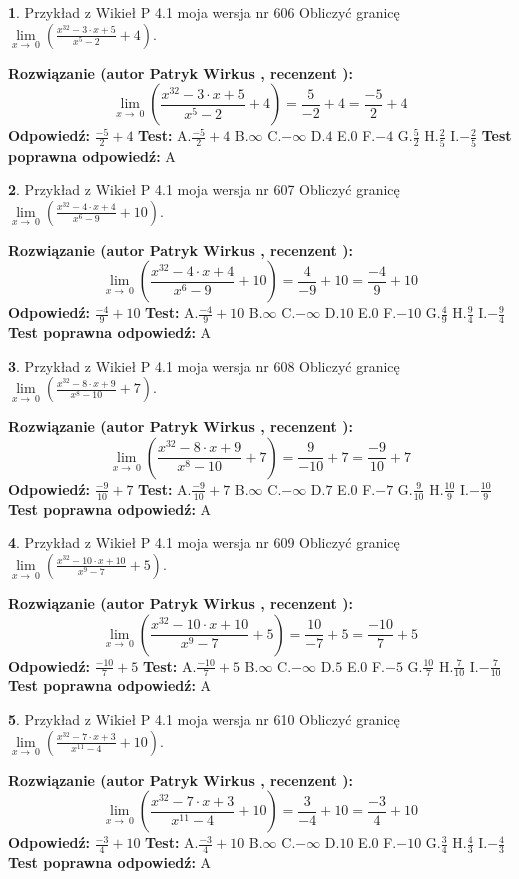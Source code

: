 \documentclass[12pt, a4paper]{article}
\theoremstyle{definition} %
\newtheorem{zad}{}
\newcommand{\zadStart}[1]{\begin{zad}#1\newline}
\newcommand{\zadStop}{\end{zad}}
\newcommand{\rozwStart}[2]{\noindent \textbf{Rozwiązanie (autor #1 , recenzent #2): }\newline}
\newcommand{\rozwStop}{\newline}
\newcommand{\odpStart}{\noindent \textbf{Odpowiedź:}\newline}
\newcommand{\odpStop}{\newline}
\newcommand{\testStart}{\noindent \textbf{Test:}\newline}
\newcommand{\testStop}{\newline}
\newcommand{\kluczStart}{\noindent \textbf{Test poprawna odpowiedź:}\newline}
\newcommand{\kluczStop}{\newline}
\begin{document}
\zadStart{Przykład z Wikieł P 4.1 moja wersja nr 606}
Obliczyć granicę $\lim\limits_{x\to\ 0}(\frac{x^{32}-3 \cdot x +5}{x^{5}-2}+4)$.
\zadStop
\rozwStart{Patryk Wirkus}{}
$$\lim\limits_{x\to\ 0}(\frac{x^{32}-3 \cdot x +5}{x^{5}-2}+4)=\frac{5}{-2}+4=\frac{-5}{2}+4$$
\rozwStop
\odpStart
$\frac{-5}{2}+4$
\odpStop
\testStart
A.$\frac{-5}{2}+4$
B.$\infty$
C.$-\infty$
D.$4$
E.$0$
F.$-4$
G.$\frac{5}{2}$
H.$\frac{2}{5}$
I.$-\frac{2}{5}$
\testStop
\kluczStart
A
\kluczStop



\zadStart{Przykład z Wikieł P 4.1 moja wersja nr 607}
Obliczyć granicę $\lim\limits_{x\to\ 0}(\frac{x^{32}-4 \cdot x +4}{x^{6}-9}+10)$.
\zadStop
\rozwStart{Patryk Wirkus}{}
$$\lim\limits_{x\to\ 0}(\frac{x^{32}-4 \cdot x +4}{x^{6}-9}+10)=\frac{4}{-9}+10=\frac{-4}{9}+10$$
\rozwStop
\odpStart
$\frac{-4}{9}+10$
\odpStop
\testStart
A.$\frac{-4}{9}+10$
B.$\infty$
C.$-\infty$
D.$10$
E.$0$
F.$-10$
G.$\frac{4}{9}$
H.$\frac{9}{4}$
I.$-\frac{9}{4}$
\testStop
\kluczStart
A
\kluczStop



\zadStart{Przykład z Wikieł P 4.1 moja wersja nr 608}
Obliczyć granicę $\lim\limits_{x\to\ 0}(\frac{x^{32}-8 \cdot x +9}{x^{8}-10}+7)$.
\zadStop
\rozwStart{Patryk Wirkus}{}
$$\lim\limits_{x\to\ 0}(\frac{x^{32}-8 \cdot x +9}{x^{8}-10}+7)=\frac{9}{-10}+7=\frac{-9}{10}+7$$
\rozwStop
\odpStart
$\frac{-9}{10}+7$
\odpStop
\testStart
A.$\frac{-9}{10}+7$
B.$\infty$
C.$-\infty$
D.$7$
E.$0$
F.$-7$
G.$\frac{9}{10}$
H.$\frac{10}{9}$
I.$-\frac{10}{9}$
\testStop
\kluczStart
A
\kluczStop



\zadStart{Przykład z Wikieł P 4.1 moja wersja nr 609}
Obliczyć granicę $\lim\limits_{x\to\ 0}(\frac{x^{32}-10 \cdot x +10}{x^{9}-7}+5)$.
\zadStop
\rozwStart{Patryk Wirkus}{}
$$\lim\limits_{x\to\ 0}(\frac{x^{32}-10 \cdot x +10}{x^{9}-7}+5)=\frac{10}{-7}+5=\frac{-10}{7}+5$$
\rozwStop
\odpStart
$\frac{-10}{7}+5$
\odpStop
\testStart
A.$\frac{-10}{7}+5$
B.$\infty$
C.$-\infty$
D.$5$
E.$0$
F.$-5$
G.$\frac{10}{7}$
H.$\frac{7}{10}$
I.$-\frac{7}{10}$
\testStop
\kluczStart
A
\kluczStop



\zadStart{Przykład z Wikieł P 4.1 moja wersja nr 610}
Obliczyć granicę $\lim\limits_{x\to\ 0}(\frac{x^{32}-7 \cdot x +3}{x^{11}-4}+10)$.
\zadStop
\rozwStart{Patryk Wirkus}{}
$$\lim\limits_{x\to\ 0}(\frac{x^{32}-7 \cdot x +3}{x^{11}-4}+10)=\frac{3}{-4}+10=\frac{-3}{4}+10$$
\rozwStop
\odpStart
$\frac{-3}{4}+10$
\odpStop
\testStart
A.$\frac{-3}{4}+10$
B.$\infty$
C.$-\infty$
D.$10$
E.$0$
F.$-10$
G.$\frac{3}{4}$
H.$\frac{4}{3}$
I.$-\frac{4}{3}$
\testStop
\kluczStart
A
\kluczStop
\end{document}

